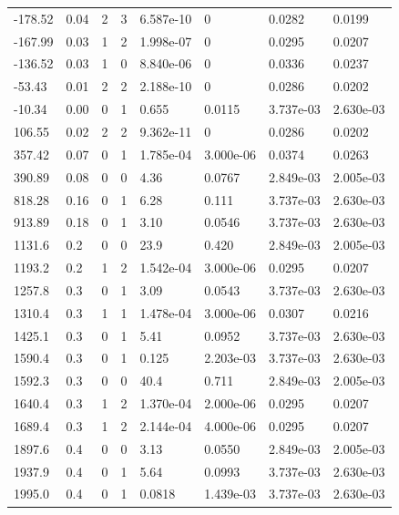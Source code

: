 \documentclass[preview]{standalone}
\begin{document}
{{\begin{tabular}{L{1.2cm}C{1.2cm} C{0.3cm}C{0.5cm} C{1.4cm}C{1.4cm} C{1.4cm}C{1.4cm}}
  -178.52  &  0.04  & 2     &  3 &  6.587e-10  & 0  & 0.0282 &  0.0199   \\ 
  -167.99  &  0.03  & 1     &  2 &  1.998e-07  & 0  & 0.0295 &  0.0207   \\ 
  -136.52  &  0.03  & 1     &  0 &  8.840e-06  & 0  & 0.0336 &  0.0237   \\ 
  -53.43  &  0.01  & 2     &  2 &  2.188e-10  & 0  & 0.0286 &  0.0202   \\ 
  -10.34  &  0.00  & 0     &  1 &  0.655  & 0.0115  & 3.737e-03 &  2.630e-03   \\ 
  106.55  &  0.02  & 2     &  2 &  9.362e-11  & 0  & 0.0286 &  0.0202   \\ 
  357.42  &  0.07  & 0     &  1 &  1.785e-04  & 3.000e-06  & 0.0374 &  0.0263   \\ 
  390.89  &  0.08  & 0     &  0 &  4.36  & 0.0767  & 2.849e-03 &  2.005e-03   \\ 
  818.28  &  0.16  & 0     &  1 &  6.28  & 0.111  & 3.737e-03 &  2.630e-03   \\ 
  913.89  &  0.18  & 0     &  1 &  3.10  & 0.0546  & 3.737e-03 &  2.630e-03   \\ 
  1131.6  &   0.2  & 0     &  0 &  23.9  & 0.420  & 2.849e-03 &  2.005e-03   \\ 
  1193.2  &   0.2  & 1     &  2 &  1.542e-04  & 3.000e-06  & 0.0295 &  0.0207   \\ 
  1257.8  &   0.3  & 0     &  1 &  3.09  & 0.0543  & 3.737e-03 &  2.630e-03   \\ 
  1310.4  &   0.3  & 1     &  1 &  1.478e-04  & 3.000e-06  & 0.0307 &  0.0216   \\ 
  1425.1  &   0.3  & 0     &  1 &  5.41  & 0.0952  & 3.737e-03 &  2.630e-03   \\ 
  1590.4  &   0.3  & 0     &  1 &  0.125  & 2.203e-03  & 3.737e-03 &  2.630e-03   \\ 
  1592.3  &   0.3  & 0     &  0 &  40.4  & 0.711  & 2.849e-03 &  2.005e-03   \\ 
  1640.4  &   0.3  & 1     &  2 &  1.370e-04  & 2.000e-06  & 0.0295 &  0.0207   \\ 
  1689.4  &   0.3  & 1     &  2 &  2.144e-04  & 4.000e-06  & 0.0295 &  0.0207   \\ 
  1897.6  &   0.4  & 0     &  0 &  3.13  & 0.0550  & 2.849e-03 &  2.005e-03   \\ 
  1937.9  &   0.4  & 0     &  1 &  5.64  & 0.0993  & 3.737e-03 &  2.630e-03   \\ 
  1995.0  &   0.4  & 0     &  1 &  0.0818  & 1.439e-03  & 3.737e-03 &  2.630e-03   \\ 

\end{tabular}}}
\end{document}
